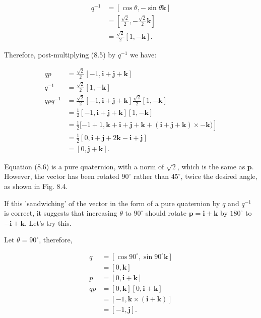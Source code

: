 \documentclass[10pt]{article}
\begin{document}
$$
\begin{aligned}
q^{-1} & =[\cos \theta,-\sin \theta \mathbf{k}] \\
& =\left[\frac{\sqrt{2}}{2},-\frac{\sqrt{2}}{2} \mathbf{k}\right] \\
& =\frac{\sqrt{2}}{2}[1,-\mathbf{k}] .
\end{aligned}
$$

Therefore, post-multiplying (8.5) by $q^{-1}$ we have:

$$
\begin{aligned}
q p & =\frac{\sqrt{2}}{2}[-1, \mathbf{i}+\mathbf{j}+\mathbf{k}] \\
q^{-1} & =\frac{\sqrt{2}}{2}[1,-\mathbf{k}] \\
q p q^{-1} & =\frac{\sqrt{2}}{2}[-1, \mathbf{i}+\mathbf{j}+\mathbf{k}] \frac{\sqrt{2}}{2}[1,-\mathbf{k}] \\
& =\frac{1}{2}[-1, \mathbf{i}+\mathbf{j}+\mathbf{k}][1,-\mathbf{k}] \\
& \left.=\frac{1}{2}[-1+1, \mathbf{k}+\mathbf{i}+\mathbf{j}+\mathbf{k}+(\mathbf{i}+\mathbf{j}+\mathbf{k}) \times-\mathbf{k})\right] \\
& =\frac{1}{2}[0, \mathbf{i}+\mathbf{j}+2 \mathbf{k}-\mathbf{i}+\mathbf{j}] \\
& =[0, \mathbf{j}+\mathbf{k}] .
\end{aligned}
$$

Equation (8.6) is a pure quaternion, with a norm of $\sqrt{2}$, which is the same as $\mathbf{p}$. However, the vector has been rotated $90^{\circ}$ rather than $45^{\circ}$, twice the desired angle, as shown in Fig. 8.4.

If this 'sandwiching' of the vector in the form of a pure quaternion by $q$ and $q^{-1}$ is correct, it suggests that increasing $\theta$ to $90^{\circ}$ should rotate $\mathbf{p}=\mathbf{i}+\mathbf{k}$ by $180^{\circ}$ to $-\mathbf{i}+\mathbf{k}$. Let's try this.

Let $\theta=90^{\circ}$, therefore,

$$
\begin{aligned}
q & =\left[\cos 90^{\circ}, \sin 90^{\circ} \mathbf{k}\right] \\
& =[0, \mathbf{k}] \\
p & =[0, \mathbf{i}+\mathbf{k}] \\
q p & =[0, \mathbf{k}][0, \mathbf{i}+\mathbf{k}] \\
& =[-1, \mathbf{k} \times(\mathbf{i}+\mathbf{k})] \\
& =[-1, \mathbf{j}] .
\end{aligned}
$$
\end{document}
